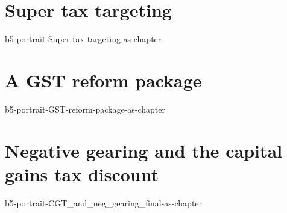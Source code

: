 \documentclass[twoside,english]{grattanBudgetRepairb5portrait}
\begin{document}
\part{Super tax targeting}\label{part:SUPER}
{b5-portrait-Super-tax-targeting-as-chapter}

\part{A GST reform package}\label{part:GST}
{b5-portrait-GST-reform-package-as-chapter}

\part{Negative gearing and the capital gains tax discount}
{b5-portrait-CGT_and_neg_gearing_final-as-chapter}





\backmatter
{}
\listoffigures
\printfigurenotes
\cleardoublepage
\listoftables
\printtablenotes
\cleardoublepage

\printendnotes
{}
\printbibliography[title={Bibliography},heading=none]
\end{document}
